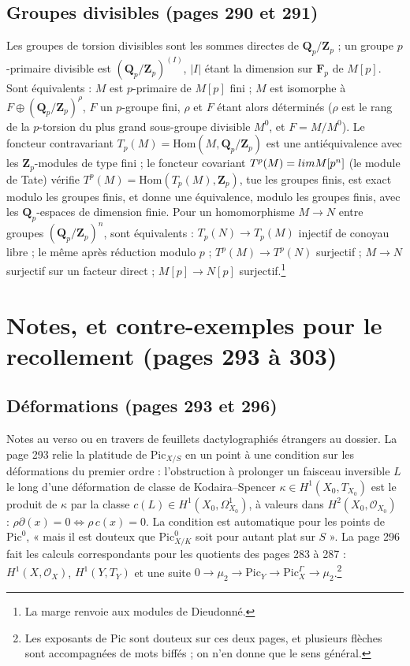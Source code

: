 \documentclass[11pt,a4paper]{article}
\begin{document}
\subsection*{Groupes divisibles (pages 290 et 291)}

Les groupes de torsion divisibles sont les sommes directes de
$\mathbf{Q}_p/\mathbf{Z}_p$ ; un groupe $p$-primaire divisible est
$(\mathbf{Q}_p/\mathbf{Z}_p)^{(I)}$, $|I|$ étant la dimension sur $\mathbf{F}_p$
de $M[p]$. Sont équivalents : $M$ est $p$-primaire de $M[p]$ fini ; $M$ est
isomorphe à $F \oplus (\mathbf{Q}_p/\mathbf{Z}_p)^\rho$, $F$ un $p$-groupe fini,
$\rho$ et $F$ étant alors déterminés ($\rho$ est le rang de la $p$-torsion du
plus grand sous-groupe divisible $M^0$, et $F = M/M^0$). Le foncteur
contravariant $T_p(M) = \mathrm{Hom}(M, \mathbf{Q}_p/\mathbf{Z}_p)$ est une
antiéquivalence avec les $\mathbf{Z}_p$-modules de type fini ; le foncteur
covariant $T^p(M) = \varprojlim M[p^n]$ (le module de Tate) vérifie
$T^p(M) = \mathrm{Hom}(T_p(M), \mathbf{Z}_p)$, tue les groupes finis, est exact
modulo les groupes finis, et donne une équivalence, modulo les groupes finis,
avec les $\mathbf{Q}_p$-espaces de dimension finie. Pour un homomorphisme
$M \to N$ entre groupes $(\mathbf{Q}_p/\mathbf{Z}_p)^n$, sont équivalents :
$T_p(N) \to T_p(M)$ injectif de conoyau libre ; le même après réduction
modulo $p$ ; $T^p(M) \to T^p(N)$ surjectif ; $M \to N$ surjectif sur un
facteur direct ; $M[p] \to N[p]$ surjectif.\footnote{La marge renvoie aux
modules de Dieudonné.}

\section*{Notes, et contre-exemples pour le recollement (pages 293 à 303)}

\subsection*{Déformations (pages 293 et 296)}

Notes au verso ou en travers de feuillets dactylographiés étrangers au
dossier. La page 293 relie la platitude de $\mathrm{Pic}_{X/S}$ en un point à
une condition sur les déformations du premier ordre : l'obstruction à
prolonger un faisceau inversible $L$ le long d'une déformation de classe de
Kodaira--Spencer $\kappa \in H^1(X_0, T_{X_0})$ est le produit de $\kappa$ par
la classe $c(L) \in H^1(X_0, \Omega^1_{X_0})$, à valeurs dans
$H^2(X_0, \mathcal{O}_{X_0})$ : $\rho\partial(x) = 0 \iff \rho\, c(x) = 0$. La
condition est automatique pour les points de $\mathrm{Pic}^0$, « mais il est
douteux que $\mathrm{Pic}^0_{X/K}$ soit pour autant plat sur $S$ ». La page 296
fait les calculs correspondants pour les quotients des pages 283 à 287 :
$H^1(X, \mathcal{O}_X)$, $H^1(Y, T_Y)$ et une suite
$0 \to \mu_2 \to \mathrm{Pic}_Y \to \mathrm{Pic}_X^\Gamma \to \mu_2$.\footnote{Les
exposants de $\mathrm{Pic}$ sont douteux sur ces deux pages, et plusieurs flèches
sont accompagnées de mots biffés ; on n'en donne que le sens général.}
\end{document}
